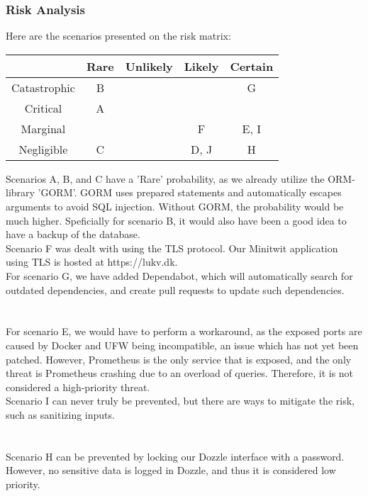\subsubsection{Risk Analysis}
Here are the scenarios presented on the risk matrix:
\begin{center}
\begin{tabular}{ |c|c|c|c|c| } 
 \hline
  & Rare & Unlikely & Likely & Certain \\ 
 \hline
 Catastrophic & B &  &  & G\\ 
 \hline
 Critical & A &  &  & \\ 
 \hline
 Marginal & &  &  F& E, I\\ 
 \hline
 Negligible & C &  & D, J & H\\ 
 \hline
\end{tabular}
\end{center}
Scenarios A, B, and C have a 'Rare' probability, as we already utilize the ORM-library 'GORM'. GORM uses prepared statements and automatically escapes arguments to avoid SQL injection. Without GORM, the probability would be much higher. Speficially for scenario B, it would also have been a good idea to have a backup of the database.\\
Scenario F was dealt with using the TLS protocol. Our Minitwit application using TLS is hosted at https://lukv.dk.\\
For scenario G, we have added Dependabot, which will automatically search for outdated dependencies, and create pull requests to update such dependencies.
\\\\
\\
For scenario E, we would have to perform a workaround, as the exposed ports are caused by Docker and UFW being incompatible, an issue which has not yet been patched. However, Prometheus is the only service that is exposed, and the only threat is Prometheus crashing due to an overload of queries. Therefore, it is not considered a high-priority threat.\\
Scenario I can never truly be prevented, but there are ways to mitigate the risk, such as sanitizing inputs. 
\\\\
\\
Scenario H can be prevented by locking our Dozzle interface with a password. However, no sensitive data is logged in Dozzle, and thus it is considered low priority.